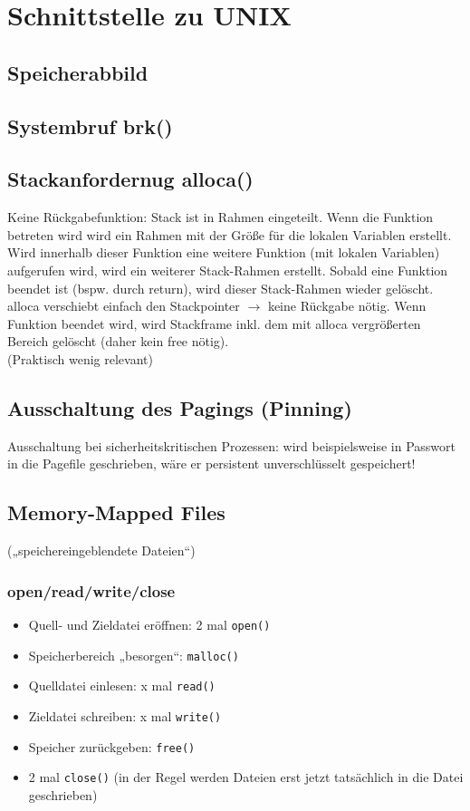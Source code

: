 \section{Schnittstelle zu UNIX}
\subsection{Speicherabbild}
\subsection{Systembruf brk()}
\subsection{Stackanfordernug alloca()}
Keine Rückgabefunktion: Stack ist in Rahmen eingeteilt. Wenn die Funktion betreten wird wird ein Rahmen mit der Größe für die lokalen Variablen erstellt. Wird innerhalb dieser Funktion eine weitere Funktion (mit lokalen Variablen) aufgerufen wird, wird ein weiterer Stack-Rahmen erstellt. Sobald eine Funktion beendet ist (bspw. durch return), wird dieser Stack-Rahmen wieder gelöscht.\\
alloca verschiebt einfach den Stackpointer $\to$ keine Rückgabe nötig. Wenn Funktion beendet wird, wird Stackframe inkl. dem mit alloca vergrößerten Bereich gelöscht (daher kein free nötig).\\
(Praktisch wenig relevant)
\subsection{Ausschaltung des Pagings (Pinning)}
Ausschaltung bei sicherheitskritischen Prozessen: wird beispielsweise in Passwort in die Pagefile geschrieben, wäre er persistent unverschlüsselt gespeichert!
\subsection{Memory-Mapped Files}
(„speichereingeblendete Dateien“)
\subsubsection*{open/read/write/close}
\begin{itemize}
\item Quell- und Zieldatei eröffnen: 2 mal \lstinline`open()`
\item Speicherbereich „besorgen“: \lstinline`malloc()`
\item Quelldatei einlesen: x mal \lstinline`read()`
\item Zieldatei schreiben: x mal \lstinline`write()`
\item Speicher zurückgeben: \lstinline`free()`
\item 2 mal \lstinline`close()` (in der Regel werden Dateien erst jetzt tatsächlich in die Datei geschrieben)
\end{itemize}
